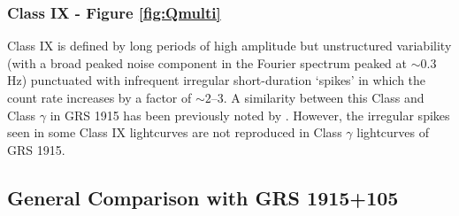 \subsubsection{Class IX - Figure \ref{fig:Qmulti}}

\label{sec:DisIX}

\par Class IX is defined by long periods of high amplitude but unstructured variability (with a broad peaked noise component in the Fourier spectrum peaked at $\sim$0.3 Hz) punctuated with infrequent irregular short-duration `spikes' in which the count rate increases by a factor of $\sim2$--$3$.  A similarity between this Class and Class $\gamma$ in GRS 1915 has been previously noted by \citet{Altamirano_HFQPO}.  However, the irregular spikes seen in some Class IX lightcurves are not reproduced in Class $\gamma$ lightcurves of GRS 1915.

\subsection{General Comparison with GRS 1915+105}

